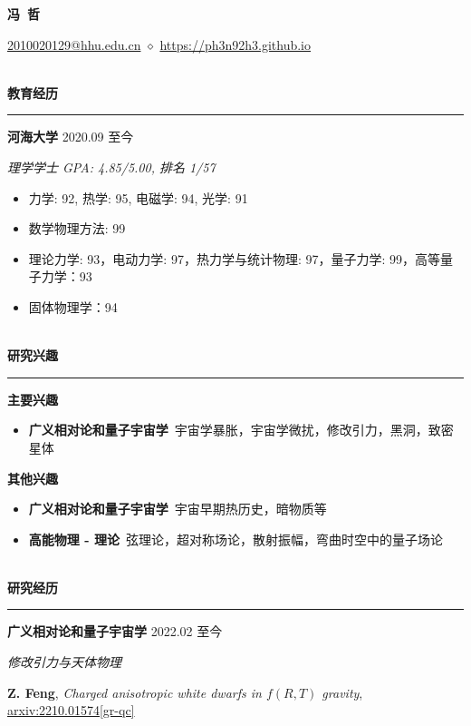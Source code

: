 \documentclass[12pt]{article}
\newcommand{\sect}[1]{
    ~\\ \noindent \textbf{#1} \medskip \hrule \medskip
}
\begin{document}
\pagestyle{empty}


\begin{center}
    \LARGE{\textbf{冯\ 哲}}
\end{center}

\begin{center}
    \href{mailto:2010020129@hhu.edu.cn}{2010020129@hhu.edu.cn} $\diamond$ \href{https://ph3n92h3.github.io}{https://ph3n92h3.github.io}
\end{center}


\sect{教育经历}

\textbf{河海大学} \hfill 2020.09 至今

\textit{理学学士 \hfill GPA: 4.85/5.00, 排名 1/57}

\begin{itemize}[noitemsep,nolistsep]
    \item 力学: 92, 热学: 95, 电磁学: 94, 光学: 91
    \item 数学物理方法: 99
    \item 理论力学: 93，电动力学: 97，热力学与统计物理: 97，量子力学: 99，高等量子力学：93
    \item 固体物理学：94
\end{itemize}


\sect{研究兴趣}

\textbf{主要兴趣}
\begin{itemize}[noitemsep,nolistsep]
    \item \textbf{广义相对论和量子宇宙学}\ 宇宙学暴胀，宇宙学微扰，修改引力，黑洞，致密星体
\end{itemize}

\textbf{其他兴趣}
\begin{itemize}[noitemsep,nolistsep]
    \item \textbf{广义相对论和量子宇宙学}\ 宇宙早期热历史，暗物质等
    \item \textbf{高能物理 - 理论}\ 弦理论，超对称场论，散射振幅，弯曲时空中的量子场论
\end{itemize}


\sect{研究经历}

\textbf{广义相对论和量子宇宙学} \hfill 2022.02 至今

\smallskip \quad \textit{修改引力与天体物理}

\textbf{Z. Feng}, \textit{Charged anisotropic white dwarfs in $f\left({R}, {T}\right)$ gravity}, \href{https://arxiv.org/abs/2210.01574}{arxiv:2210.01574[gr-qc]}
\end{document}
